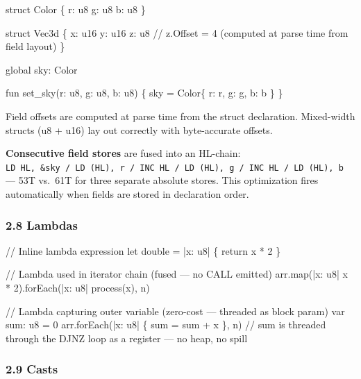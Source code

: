 \documentclass[
  11pt,
]{article}
\newenvironment{Shaded}{\begin{snugshade}}{\end{snugshade}}
\newcommand{\NormalTok}[1]{#1}
\begin{document}
\begin{Shaded}
\begin{Highlighting}[]
\NormalTok{struct Color \{}
\NormalTok{    r: u8}
\NormalTok{    g: u8}
\NormalTok{    b: u8}
\NormalTok{\}}

\NormalTok{struct Vec3d \{}
\NormalTok{    x: u16}
\NormalTok{    y: u16}
\NormalTok{    z: u8       // z.Offset = 4 (computed at parse time from field layout)}
\NormalTok{\}}

\NormalTok{global sky: Color}

\NormalTok{fun set\_sky(r: u8, g: u8, b: u8) \{}
\NormalTok{    sky = Color\{ r: r, g: g, b: b \}}
\NormalTok{\}}
\end{Highlighting}
\end{Shaded}

Field offsets are computed at parse time from the struct declaration.
Mixed-width structs (u8 + u16) lay out correctly with byte-accurate
offsets.

\textbf{Consecutive field stores} are fused into an HL-chain:
\texttt{LD\ HL,\ \&sky\ /\ LD\ (HL),\ r\ /\ INC\ HL\ /\ LD\ (HL),\ g\ /\ INC\ HL\ /\ LD\ (HL),\ b}
--- 53T vs.~61T for three separate absolute stores. This optimization
fires automatically when fields are stored in declaration order.

\hypertarget{lambdas}{%
\subsubsection{2.8 Lambdas}\label{lambdas}}

\begin{Shaded}
\begin{Highlighting}[]
\NormalTok{// Inline lambda expression}
\NormalTok{let double = |x: u8| \{ return x * 2 \}}

\NormalTok{// Lambda used in iterator chain (fused — no CALL emitted)}
\NormalTok{arr.map(|x: u8| x * 2).forEach(|x: u8| process(x), n)}

\NormalTok{// Lambda capturing outer variable (zero{-}cost — threaded as block param)}
\NormalTok{var sum: u8 = 0}
\NormalTok{arr.forEach(|x: u8| \{ sum = sum + x \}, n)}
\NormalTok{// sum is threaded through the DJNZ loop as a register — no heap, no spill}
\end{Highlighting}
\end{Shaded}

\hypertarget{casts}{%
\subsubsection{2.9 Casts}\label{casts}}
\end{document}
